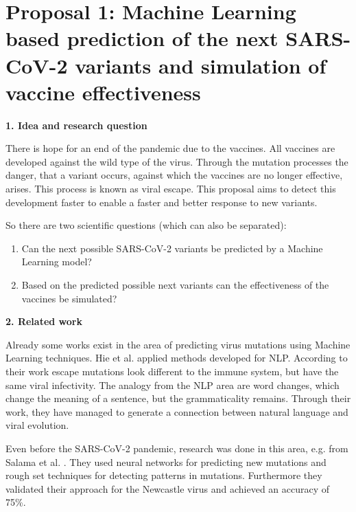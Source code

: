 \section{Proposal 1: Machine Learning based prediction of the next SARS-CoV-2 variants and simulation of vaccine effectiveness}

\textbf{1. Idea and research question}

There is hope for an end of the pandemic due to the vaccines. All vaccines are developed against the wild type of the virus. Through the mutation processes the danger, that a variant occurs, against which the vaccines  are no longer effective, arises. This process is known as viral escape. This proposal aims to detect this development faster to enable a faster and better response to new variants.

So there are two scientific questions (which can also be separated):
\begin{enumerate}
	\item Can the next possible SARS-CoV-2 variants be predicted by a Machine Learning model?
	\item Based on the  predicted possible next variants can the effectiveness of the vaccines be simulated?
\end{enumerate}

\textbf{2. Related work}

Already some works exist in the area of predicting virus mutations using Machine Learning techniques. Hie et al. \cite{Hie284} applied methods developed for \ac{NLP}.  According to their work escape mutations look different to the immune system, but have the same viral infectivity. The analogy from the \ac{NLP} area are word changes, which change the meaning of a sentence, but the grammaticality remains. Through their work, they have managed to generate a connection between natural language and viral evolution.

Even before the SARS-CoV-2 pandemic, research was done in this area, e.g. from Salama et al. \cite{salamaPredictionVirusMutation2016}. They used neural networks for predicting new mutations and rough set techniques for detecting patterns in mutations. Furthermore they validated their approach for the Newcastle virus and achieved an accuracy of 75\%.


